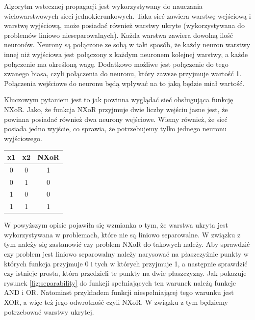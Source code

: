 Algorytm wstecznej propagacji jest wykorzystywany do nauczania wielowarstwowych sieci jednokierunkowych.
Taka sieć zawiera warstwę wejściową i warstwę wyjściową,
może posiadać również warstwy ukryte (wykorzystywana do problemów liniowo nieseparowalnych).
Każda warstwa zawiera dowolną ilość neuronów.
Neurony są połączone ze sobą w taki sposób, że każdy neuron warstwy innej niż wyjściowa jest połączony z każdym neuronem kolejnej warstwy,
a każde połączenie ma określoną wagę.
Dodatkowo możliwe jest połączenie do tego zwanego biasa, czyli połączenia do neuronu, który zawsze przyjmuje wartość 1.
Połączenia wejściowe do neuronu będą wpływać na to jaką będzie miał wartość.

Kluczowym pytaniem jest to jak powinna wyglądać sieć obsługująca funkcję NXoR. 
Jako, że funkcja NXoR przyjmuje dwie liczby wejściu jasne jest, że powinna posiadać również dwa neurony wejściowe.
Wiemy również, że sieć posiada jedno wyjście, co sprawia, że potrzebujemy tylko jednego neuronu wyjściowego.

\begin{center}
  \begin{tabular}{||c c c||} 
  \hline
  x1 & x2 & NXoR \\ [0.5ex] 
  \hline\hline
  0 & 0 & 1\\ 
  \hline
  0 & 1 & 0 \\
  \hline
  1 & 0 & 0 \\
  \hline
  1 & 1 & 1 \\ [0.5ex] 
  \hline
 \end{tabular}
 \end{center}
 
W powyższym opisie pojawiła się wzmianka o tym, że warstwa ukryta jest wykorzystywana w problemach, które nie są liniowo separowalne.
W związku z tym należy się zastanowić czy problem NXoR do takowych należy.
Aby sprawdzić czy problem jest liniowo separowalny należy narysować na płaszczyźnie punkty w których funkcja przyjmuje 0 i tych w których przyjmuje 1, a następnie sprawdzić czy istnieje prosta, która przedzieli te punkty na dwie płaszczyzny.
Jak pokazuje rysunek \ref{fig:separability} do funkcji spełniających ten warunek należą funkcje AND i OR.
Natomiast przykładem funkcji niespełniającej tego warunku jest XOR, a więc też jego odwrotność czyli NXoR.
W związku z tym będziemy potrzebować warstwy ukrytej.
 
